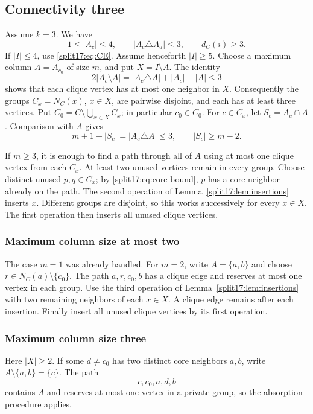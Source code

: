 \documentclass[11pt,a4paper]{article}
\theoremstyle{definition}\newtheorem{definition}[theorem]{Definition}
\theoremstyle{remark}\newtheorem{remark}[theorem]{Remark}
\begin{document}
\subsection{Connectivity three}\label{split17:sec:k3}
Assume $k=3$. We have
\begin{equation}\label{split17:eq:k3}
 1\le|A_c|\le4,\qquad |A_c\triangle A_d|\le3,
 \qquad d_C(i)\ge3.
\end{equation}
If $|I|\le4$, use \eqref{split17:eq:CE}. Assume henceforth $|I|\ge5$.
Choose a maximum column $A=A_{c_0}$ of size $m$, and put $X=I\setminus A$.
The identity
\[
 2|A_c\setminus A|=|A_c\triangle A|+|A_c|-|A|\le3
\]
shows that each clique vertex has at most one neighbor in $X$.
Consequently the groups $C_x=N_C(x)$, $x\in X$, are pairwise disjoint,
and each has at least three vertices. Put
$C_0=C\setminus\bigcup_{x\in X}C_x$; in particular $c_0\in C_0$.
For $c\in C_x$, let $S_c=A_c\cap A$. Comparison with $A$ gives
\begin{equation}\label{split17:eq:core-bound}
 m+1-|S_c|=|A_c\triangle A|\le3,
 \qquad |S_c|\ge m-2.
\end{equation}

If $m\ge3$, it is enough to find a path through all of $A$ using at most
one clique vertex from each $C_x$. At least two unused vertices remain
in every group. Choose distinct unused $p,q\in C_x$; by
\eqref{split17:eq:core-bound}, $p$ has a core neighbor already on the path.
The second operation of Lemma~\ref{split17:lem:insertions} inserts $x$.
Different groups are disjoint, so this works successively for every
$x\in X$. The first operation then inserts all unused clique vertices.

\subsubsection{Maximum column size at most two}
The case $m=1$ was already handled. For $m=2$, write $A=\{a,b\}$ and
choose $r\in N_C(a)\setminus\{c_0\}$. The path $a,r,c_0,b$ has a clique
edge and reserves at most one vertex in each group. Use the third
operation of Lemma~\ref{split17:lem:insertions} with two remaining neighbors
of each $x\in X$. A clique edge remains after each insertion. Finally
insert all unused clique vertices by its first operation.

\subsubsection{Maximum column size three}
Here $|X|\ge2$. If some $d\ne c_0$ has two distinct core neighbors $a,b$,
write $A\setminus\{a,b\}=\{c\}$. The path
\[
 c,c_0,a,d,b
\]
contains $A$ and reserves at most one vertex in a private group, so the
absorption procedure applies.
\end{document}
